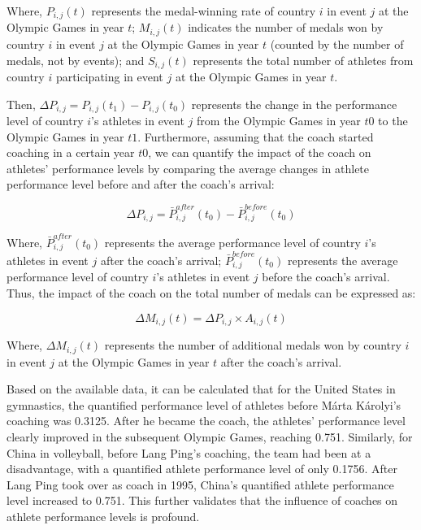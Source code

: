 \documentclass{mcmthesis}
\begin{document}
Where, $P_{i, j}(t)$ represents the medal-winning rate of country $i$ in event $j$ at the Olympic Games in year $t$; $M_{i, j}(t)$ indicates the number of medals won by country $i$ in event $j$ at the Olympic Games in year $t$ (counted by the number of medals, not by events); and $S_{i, j}(t)$ represents the total number of athletes from country $i$ participating in event $j$ at the Olympic Games in year $t$.

Then, $\Delta P_{i, j} = P_{i, j}(t_{1}) - P_{i, j}(t_{0})$ represents the change in the performance level of country $i$'s athletes in event $j$ from the Olympic Games in year $t0$ to the Olympic Games in year $t1$. Furthermore, assuming that the coach started coaching in a certain year $t0$, we can quantify the impact of the coach on athletes' performance levels by comparing the average changes in athlete performance level before and after the coach's arrival:

\begin{equation}
\Delta P_{i, j} = \bar{P}_{i, j}^{after}(t_{0}) - \bar{P}_{i, j}^{before}(t_{0})
\end{equation}

Where, $\bar{P}_{i, j}^{after}(t_{0})$ represents the average performance level of country $i$'s athletes in event $j$ after the coach's arrival; $\bar{P}_{i, j}^{before}(t_{0})$ represents the average performance level of country $i$'s athletes in event $j$ before the coach's arrival. Thus, the impact of the coach on the total number of medals can be expressed as:

\begin{equation}
\Delta M_{i, j}(t) = \Delta P_{i, j} \times A_{i, j}(t)
\end{equation}

Where, $\Delta M_{i, j}(t)$ represents the number of additional medals won by country $i$ in event $j$ at the Olympic Games in year $t$ after the coach's arrival.

Based on the available data, it can be calculated that for the United States in gymnastics, the quantified performance level of athletes before Márta Károlyi's coaching was 0.3125. After he became the coach, the athletes' performance level clearly improved in the subsequent Olympic Games, reaching 0.751. Similarly, for China in volleyball, before Lang Ping's coaching, the team had been at a disadvantage, with a quantified athlete performance level of only 0.1756. After Lang Ping took over as coach in 1995, China's quantified athlete performance level increased to 0.751. This further validates that the influence of coaches on athlete performance levels is profound.
\end{document}
